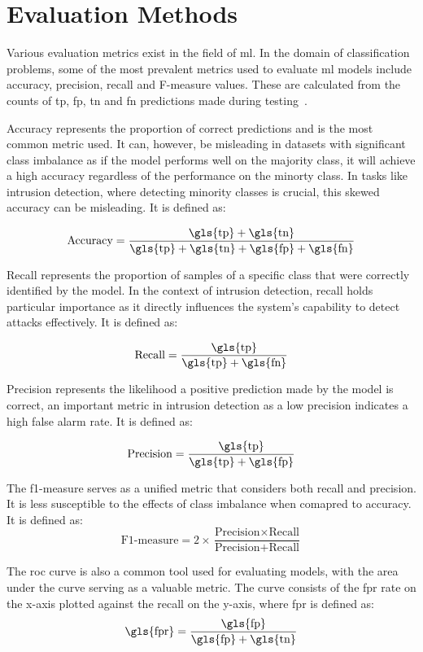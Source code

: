 \section{Evaluation Methods}%
\label{sec:eval}

Various evaluation metrics exist in the field of \gls{ml}. In the domain of
classification problems, some of the most prevalent metrics used to evaluate
\gls{ml} models include accuracy, precision, recall and F-measure values. These
are calculated from the counts of \gls{tp}, \gls{fp}, \gls{tn} and \gls{fn}
predictions made during testing~\cite{metrics}.

Accuracy represents the proportion of correct predictions and is the most
common metric used. It can, however, be misleading in datasets with significant
class imbalance as if the model performs well on the majority class, it will
achieve a high accuracy regardless of the performance on the minorty class. In
tasks like intrusion detection, where detecting minority classes is crucial,
this skewed accuracy can be misleading. It is defined as:

\[ \text{Accuracy} = \frac{\text{\gls{tp}}+\text{\gls{tn}}}{\text{\gls{tp}}+\text{\gls{tn}}+\text{\gls{fp}}+\text{\gls{fn}}} \]

Recall represents the proportion of samples of a specific class that were
correctly identified by the model. In the context of intrusion detection,
recall holds particular importance as it directly influences the system's
capability to detect attacks effectively. It is defined as:

\[ \text{Recall} = \frac{\text{\gls{tp}}}{\text{\gls{tp}}+\text{\gls{fn}}} \]

Precision represents the likelihood a positive prediction made by the model is
correct, an important metric in intrusion detection as a low precision
indicates a high false alarm rate. It is defined as:

\[ \text{Precision} = \frac{\text{\gls{tp}}}{\text{\gls{tp}}+\text{\gls{fp}}} \]

The f1-measure serves as a unified metric that considers both recall and
precision. It is less susceptible to the effects of class imbalance when
comapred to accuracy. It is defined as:
\[ \text{F1-measure} = 2 \times \frac{\text{Precision} \times \text{Recall}}{\text{Precision} + \text{Recall}} \]

The \gls{roc} curve is also a common tool used for evaluating models, with the
area under the curve serving as a valuable metric. The curve consists of the
\gls{fpr} rate on the x-axis plotted against the recall on the y-axis, where
\gls{fpr} is defined as:
\[ \text{\gls{fpr}} = \frac{\text{\gls{fp}}}{\text{\gls{fp}} + \text{\gls{tn}}} \]

